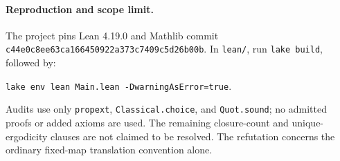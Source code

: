\documentclass[11pt]{article}
\begin{document}
\paragraph{Reproduction and scope limit.}
The project pins Lean 4.19.0 and Mathlib commit
\texttt{c44e0c8ee63ca166450922a373c7409c5d26b00b}.
In \texttt{lean/}, run \texttt{lake build}, followed by:
\begin{center}
\small\texttt{lake env lean Main.lean -DwarningAsError=true}.
\end{center}
Audits use only \texttt{propext}, \texttt{Classical.choice}, and \texttt{Quot.sound}; no admitted proofs or added axioms are used. The remaining closure-count and unique-ergodicity clauses are not claimed to be resolved. The refutation concerns the ordinary fixed-map translation convention alone.
\end{document}
